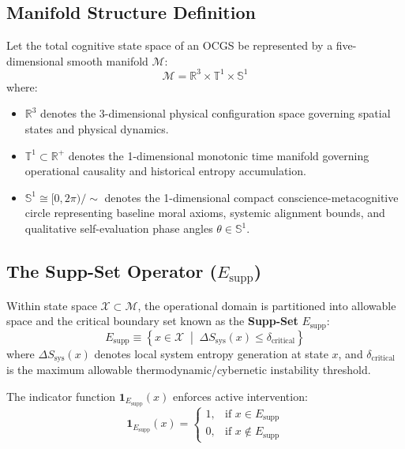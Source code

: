\documentclass[journal,twocolumn,10pt]{IEEEtran}
\begin{document}
\subsection{Manifold Structure Definition}
Let the total cognitive state space of an OCGS be represented by a five-dimensional smooth manifold $\mathcal{M}$:
\begin{equation}
\mathcal{M} = \mathbb{R}^3 \times \mathbb{T}^1 \times \mathbb{S}^1
\end{equation}
where:
\begin{itemize}
    \item $\mathbb{R}^3$ denotes the 3-dimensional physical configuration space governing spatial states and physical dynamics.
    \item $\mathbb{T}^1 \subset \mathbb{R}^+$ denotes the 1-dimensional monotonic time manifold governing operational causality and historical entropy accumulation.
    \item $\mathbb{S}^1 \cong [0, 2\pi) / \sim$ denotes the 1-dimensional compact conscience-metacognitive circle representing baseline moral axioms, systemic alignment bounds, and qualitative self-evaluation phase angles $\theta \in \mathbb{S}^1$.
\end{itemize}

\subsection{The Supp-Set Operator ($E_{\text{supp}}$)}
Within state space $\mathcal{X} \subset \mathcal{M}$, the operational domain is partitioned into allowable space and the critical boundary set known as the \textbf{Supp-Set} $E_{\text{supp}}$:
\begin{equation}
E_{\text{supp}} \equiv \left\{ x \in \mathcal{X} \;\middle|\; \Delta S_{\text{sys}}(x) \le \delta_{\text{critical}} \right\}
\end{equation}
where $\Delta S_{\text{sys}}(x)$ denotes local system entropy generation at state $x$, and $\delta_{\text{critical}}$ is the maximum allowable thermodynamic/cybernetic instability threshold.

The indicator function $\mathbf{1}_{E_{\text{supp}}}(x)$ enforces active intervention:
\begin{equation}
\mathbf{1}_{E_{\text{supp}}}(x) = 
\begin{cases} 
1, & \text{if } x \in E_{\text{supp}} \\ 
0, & \text{if } x \notin E_{\text{supp}} 
\end{cases}
\end{equation}
\end{document}
